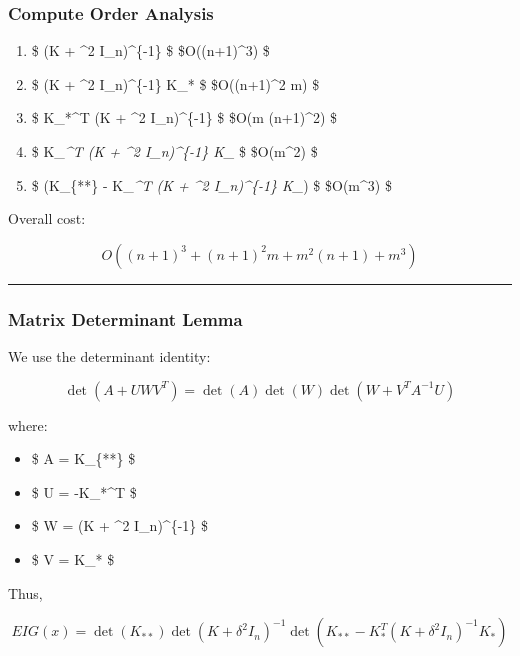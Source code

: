 \documentclass[
  letterpaper,
  DIV=11,
  numbers=noendperiod]{scrartcl}
\providecommand{\tightlist}{%
  \setlength{\itemsep}{0pt}\setlength{\parskip}{0pt}}\usepackage{longtable,booktabs,array}
\begin{document}
\hypertarget{compute-order-analysis}{%
\subsubsection{Compute Order Analysis}\label{compute-order-analysis}}

\begin{enumerate}
\def\labelenumi{\arabic{enumi}.}
\tightlist
\item
  \$ (K + \delta\^{}2 I\_n)\^{}\{-1\} \$ \$\quad O((n+1)\^{}3) \$
\item
  \$ (K + \delta\^{}2 I\_n)\^{}\{-1\} K\_* \$ \$\quad O((n+1)\^{}2 m) \$
\item
  \$ K\_*\^{}T (K + \delta\^{}2 I\_n)\^{}\{-1\} \$ \$\quad O(m
  (n+1)\^{}2) \$
\item
  \$ K\_\emph{\^{}T (K + \delta\^{}2 I\_n)\^{}\{-1\} K\_} \$
  \$\quad O(m\^{}2) \$
\item
  \$ \det(K\_\{**\} - K\_\emph{\^{}T (K + \delta\^{}2 I\_n)\^{}\{-1\}
  K\_}) \$ \$\quad O(m\^{}3) \$
\end{enumerate}

Overall cost:

\[
O((n+1)^3 + (n+1)^2 m + m^2 (n+1) + m^3)
\]

\begin{center}\rule{0.5\linewidth}{0.5pt}\end{center}

\hypertarget{matrix-determinant-lemma}{%
\subsubsection{Matrix Determinant
Lemma}\label{matrix-determinant-lemma}}

We use the determinant identity:

\[
\det(A + UWV^T) = \det(A) \det(W) \det(W + V^T A^{-1} U)
\]

where:

\begin{itemize}
\tightlist
\item
  \$ A = K\_\{**\} \$
\item
  \$ U = -K\_*\^{}T \$
\item
  \$ W = (K + \delta\^{}2 I\_n)\^{}\{-1\} \$
\item
  \$ V = K\_* \$
\end{itemize}

Thus,

\[
EIG(x) = \det(K_{**}) \det(K + \delta^2 I_n)^{-1} \det(K_{**} - K_*^T (K + \delta^2 I_n)^{-1} K_*)
\]
\end{document}

